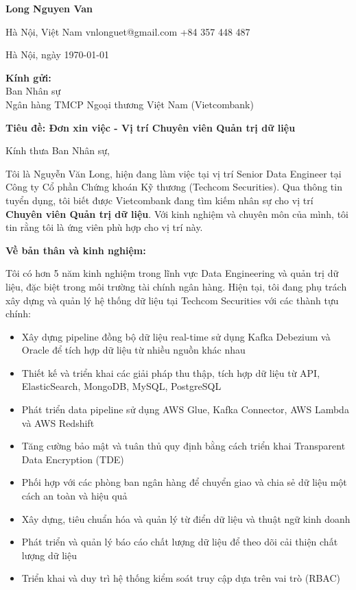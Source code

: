\documentclass[11pt, letterpaper]{article}
\newcommand{\contactinfo}[1]{%
    \begin{center}
        \color{primaryColor}
        \large\textbf{Long Nguyen Van}\\
        \normalsize\color{black}
        #1
    \end{center}
}
\begin{document}
\contactinfo{
    {\footnotesize\faMapMarker*} Hà Nội, Việt Nam \quad
    {\footnotesize\faEnvelope[regular]} vnlonguet@gmail.com \quad
    {\footnotesize\faPhone*} +84 357 448 487
}

\vspace{1cm}

\begin{flushright}
Hà Nội, ngày \today
\end{flushright}

\textbf{Kính gửi:}\\
Ban Nhân sự\\
Ngân hàng TMCP Ngoại thương Việt Nam (Vietcombank)

\textbf{Tiêu đề: Đơn xin việc - Vị trí Chuyên viên Quản trị dữ liệu}

Kính thưa Ban Nhân sự,

Tôi là Nguyễn Văn Long, hiện đang làm việc tại vị trí Senior Data Engineer tại Công ty Cổ phần Chứng khoán Kỹ thương (Techcom Securities). Qua thông tin tuyển dụng, tôi biết được Vietcombank đang tìm kiếm nhân sự cho vị trí \textbf{Chuyên viên Quản trị dữ liệu}. Với kinh nghiệm và chuyên môn của mình, tôi tin rằng tôi là ứng viên phù hợp cho vị trí này.

\textbf{Về bản thân và kinh nghiệm:}

Tôi có hơn 5 năm kinh nghiệm trong lĩnh vực Data Engineering và quản trị dữ liệu, đặc biệt trong môi trường tài chính ngân hàng. Hiện tại, tôi đang phụ trách xây dựng và quản lý hệ thống dữ liệu tại Techcom Securities với các thành tựu chính:

\begin{itemize}[leftmargin=1.5cm]
    \item Xây dựng pipeline đồng bộ dữ liệu real-time sử dụng Kafka Debezium và Oracle để tích hợp dữ liệu từ nhiều nguồn khác nhau
    \item Thiết kế và triển khai các giải pháp thu thập, tích hợp dữ liệu từ API, ElasticSearch, MongoDB, MySQL, PostgreSQL
    \item Phát triển data pipeline sử dụng AWS Glue, Kafka Connector, AWS Lambda và AWS Redshift
    \item Tăng cường bảo mật và tuân thủ quy định bằng cách triển khai Transparent Data Encryption (TDE)
    \item Phối hợp với các phòng ban ngân hàng để chuyển giao và chia sẻ dữ liệu một cách an toàn và hiệu quả
    \item Xây dựng, tiêu chuẩn hóa và quản lý từ điển dữ liệu và thuật ngữ kinh doanh
    \item Phát triển và quản lý báo cáo chất lượng dữ liệu để theo dõi cải thiện chất lượng dữ liệu
    \item Triển khai và duy trì hệ thống kiểm soát truy cập dựa trên vai trò (RBAC)
\end{itemize}
\end{document}

